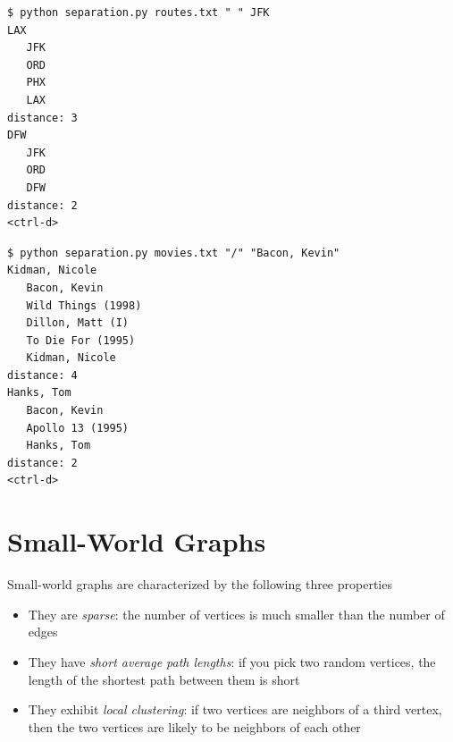 \documentclass[8pt,a4paper,compress,handout]{beamer}
\begin{document}
\begin{frame}[fragile]
\begin{lstlisting}[language={}]
$ python separation.py routes.txt " " JFK
LAX   
   JFK
   ORD
   PHX
   LAX
distance: 3
DFW
   JFK
   ORD
   DFW
distance: 2
<ctrl-d>
\end{lstlisting}

\begin{lstlisting}[language={}]
$ python separation.py movies.txt "/" "Bacon, Kevin"
Kidman, Nicole
   Bacon, Kevin
   Wild Things (1998)
   Dillon, Matt (I)
   To Die For (1995)
   Kidman, Nicole
distance: 4
Hanks, Tom
   Bacon, Kevin
   Apollo 13 (1995)
   Hanks, Tom
distance: 2
<ctrl-d>
\end{lstlisting}
\end{frame}

\section{Small-World Graphs}
\begin{frame}[fragile]
Small-world graphs are characterized by the following three properties

\begin{itemize}
\item They are \emph{sparse}: the number of vertices is much smaller than the number of edges

\item They have \emph{short average path lengths}: if you pick two random vertices, the length of the shortest path between them is short

\item They exhibit \emph{local clustering}: if two vertices are neighbors of a third vertex, then the two vertices are likely to be neighbors of each other
\end{itemize}
\end{frame}
\end{document}

